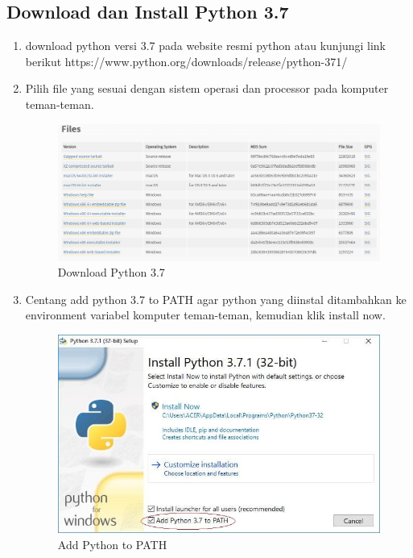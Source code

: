 \subsection{Download dan Install Python 3.7}
\begin{enumerate}
\item download python versi 3.7 pada website resmi python atau kunjungi link berikut https://www.python.org/downloads/release/python-371/

\item Pilih file yang sesuai dengan sistem operasi dan processor pada komputer teman-teman.
\begin{figure}[H]
\centering
\includegraphics[scale=.4]{figures/python1}
\caption{Download Python 3.7}
\label{python1}
\end{figure}

\item Centang add python 3.7 to PATH agar python yang diinstal ditambahkan ke environment variabel komputer teman-teman, kemudian klik install now.
\begin{figure}[H]
\centering
\includegraphics[scale=.4]{figures/python2}
\caption{Add Python to PATH}
\label{python2}
\end{figure}


\end{enumerate}
